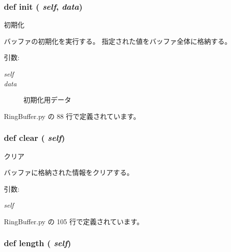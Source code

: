 \subsubsection{\setlength{\rightskip}{0pt plus 5cm}def init ( {\em self},  {\em data})}\label{classsource__py_1_1_ring_buffer_1_1_ring_buffer_c95cf511c1f2ff09ca47fe587657c2b4}


初期化 

バッファの初期化を実行する。 指定された値をバッファ全体に格納する。

\begin{Desc}
\item[引数:]
\begin{description}
\item[{\em self}]\item[{\em data}]初期化用データ \end{description}
\end{Desc}


 RingBuffer.py の 88 行で定義されています。
\subsubsection{\setlength{\rightskip}{0pt plus 5cm}def clear ( {\em self})}\label{classsource__py_1_1_ring_buffer_1_1_ring_buffer_07b95aa63e9e2d286ef0aa83d5bb34b2}


クリア 

バッファに格納された情報をクリアする。

\begin{Desc}
\item[引数:]
\begin{description}
\item[{\em self}]\end{description}
\end{Desc}


 RingBuffer.py の 105 行で定義されています。
\subsubsection{\setlength{\rightskip}{0pt plus 5cm}def length ( {\em self})}\label{classsource__py_1_1_ring_buffer_1_1_ring_buffer_de624967a623600100475a859a3cc0a4}


